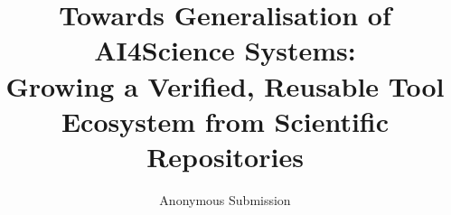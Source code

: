 \documentclass[letterpaper]{article} %
\title{Towards Generalisation of AI4Science Systems:\\
       Growing a Verified, Reusable Tool Ecosystem from Scientific Repositories}
\author{Anonymous Submission}
\begin{document}
\maketitle














\appendix


\def\isChecklistMainFile{}

\end{document}
